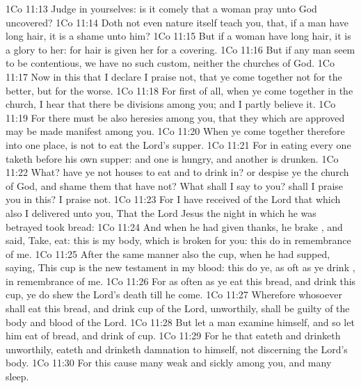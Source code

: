 \vs 1Co 11:13 Judge in yourselves: is it comely that a woman pray unto God uncovered?
\vs 1Co 11:14 Doth not even nature itself teach you, that, if a man have long hair, it is a shame unto him?
\vs 1Co 11:15 But if a woman have long hair, it is a glory to her: for  hair is given her for a covering.
\vs 1Co 11:16 But if any man seem to be contentious, we have no such custom, neither the churches of God.
\vs 1Co 11:17 Now in this that I declare  I praise  not, that ye come together not for the better, but for the worse.
\vs 1Co 11:18 For first of all, when ye come together in the church, I hear that there be divisions among you; and I partly believe it.
\vs 1Co 11:19 For there must be also heresies among you, that they which are approved may be made manifest among you.
\vs 1Co 11:20 When ye come together therefore into one place,  is not to eat the Lord's supper.
\vs 1Co 11:21 For in eating every one taketh before  his own supper: and one is hungry, and another is drunken.
\vs 1Co 11:22 What? have ye not houses to eat and to drink in? or despise ye the church of God, and shame them that have not? What shall I say to you? shall I praise you in this? I praise  not.
\vs 1Co 11:23 For I have received of the Lord that which also I delivered unto you, That the Lord Jesus the  night in which he was betrayed took bread:
\vs 1Co 11:24 And when he had given thanks, he brake , and said, Take, eat: this is my body, which is broken for you: this do in remembrance of me.
\vs 1Co 11:25 After the same manner also  the cup, when he had supped, saying, This cup is the new testament in my blood: this do ye, as oft as ye drink , in remembrance of me.
\vs 1Co 11:26 For as often as ye eat this bread, and drink this cup, ye do shew the Lord's death till he come.
\vs 1Co 11:27 Wherefore whosoever shall eat this bread, and drink  cup of the Lord, unworthily, shall be guilty of the body and blood of the Lord.
\vs 1Co 11:28 But let a man examine himself, and so let him eat of  bread, and drink of  cup.
\vs 1Co 11:29 For he that eateth and drinketh unworthily, eateth and drinketh damnation to himself, not discerning the Lord's body.
\vs 1Co 11:30 For this cause many  weak and sickly among you, and many sleep.
